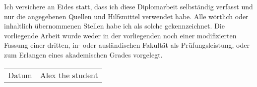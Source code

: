 \newcommand{\theauthor}{Alex the student}
\pagestyle{empty}

\setlength{\parindent}{0in}
Ich versichere an Eides statt, dass ich diese Diplomarbeit selbst\"andig verfasst und nur die angegebenen Quellen und Hilfsmittel verwendet habe.
%
Alle w\"ortlich oder inhaltlich \"ubernommenen Stellen habe ich als solche gekennzeichnet.
%
Die vorliegende Arbeit wurde weder in der vorliegenden noch einer modifizierten Fassung einer dritten, in- oder ausl\"andischen Fakult\"at als Pr\"ufungsleistung, oder zum Erlangen eines akademischen Grades vorgelegt.

\vspace{1cm}

\begin{flushright}
	\begin{tabular}{p{2cm}p{6cm}}
		\hline
		Datum & \theauthor
		\smallskip
	\end{tabular}
\end{flushright}
